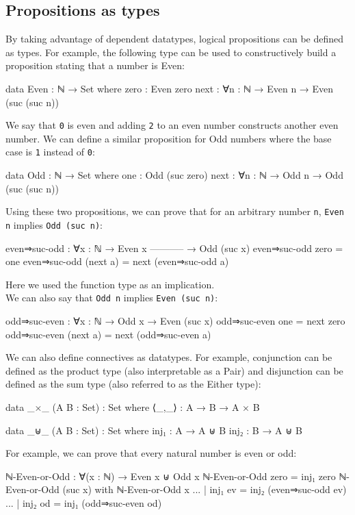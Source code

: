 \subsection{Propositions as types}
By taking advantage of dependent datatypes, logical propositions can be defined as types. For example, the following type can be used to constructively build a proposition stating that a number is Even:
\begin{agda}
data Even : ℕ → Set where
  zero : Even zero
  next : ∀{n : ℕ}
    → Even n
    → Even (suc (suc n))
\end{agda}
We say that \texttt{0} is even and adding \texttt{2} to an even number constructs another even number. We can define a similar proposition for Odd numbers where the base case is \texttt{1} instead of \texttt{0}: 
\begin{agda}
data Odd : ℕ → Set where
  one : Odd (suc zero)
  next : ∀{n : ℕ}
    → Odd n
    → Odd (suc (suc n))
\end{agda}
Using these two propositions, we can prove that for an arbitrary number \texttt{n}, \texttt{Even n} implies \texttt{Odd (suc n)}:
\begin{agda}
even⇒suc-odd : ∀{x : ℕ} 
  → Even x
    -----------
  → Odd (suc x)
even⇒suc-odd zero = one
even⇒suc-odd (next a) = next (even⇒suc-odd a)
\end{agda}
Here we used the function type as an implication.\\
We can also say that \texttt{Odd n} implies \texttt{Even (suc n)}:
\begin{agda}
odd⇒suc-even : ∀{x : ℕ} → Odd x → Even (suc x)
odd⇒suc-even one = next zero
odd⇒suc-even (next a) = next (odd⇒suc-even a)
\end{agda}
We can also define connectives as datatypes. For example, conjunction can be defined as the product type (also interpretable as a Pair) and disjunction can be defined as the sum type (also referred to as the Either type):
\begin{agda}
data _×_ (A B : Set) : Set where
  ⟨_,_⟩ : A → B → A × B
  
data _⊎_ (A B : Set) : Set where
  inj₁ : A → A ⊎ B
  inj₂ : B → A ⊎ B
\end{agda}
For example, we can prove that every natural number is even or odd:
\begin{agda}
ℕ-Even-or-Odd : ∀(x : ℕ) → Even x ⊎ Odd x
ℕ-Even-or-Odd zero = inj₁ zero
ℕ-Even-or-Odd (suc x) with ℕ-Even-or-Odd x
... | inj₁ ev = inj₂ (even⇒suc-odd ev)
... | inj₂ od = inj₁ (odd⇒suc-even od)
\end{agda}

